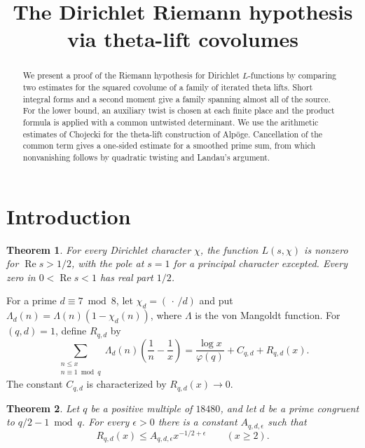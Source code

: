 \documentclass[11pt,reqno]{amsart}
\title[Dirichlet zeros and theta-lift volumes]{The Dirichlet Riemann hypothesis via theta-lift covolumes}
\newtheorem{theorem}{Theorem}[section]
\theoremstyle{definition}
\numberwithin{equation}{section}
\newcommand{\re}{\operatorname{Re}}
\begin{document}
\begin{abstract}
We present a proof of the Riemann hypothesis for Dirichlet
\(L\)-functions by comparing two estimates for the squared covolume
of a family of iterated theta lifts. Short integral forms and a
second moment give a family spanning almost all of the source.
For the lower bound, an auxiliary twist is chosen at each finite
place and the product formula is applied with a common untwisted
determinant. We use the arithmetic estimates of Chojecki for the
theta-lift construction of Alp\"oge. Cancellation of the common term
gives a one-sided estimate for a smoothed prime sum, from which
nonvanishing follows by quadratic twisting and Landau's argument.
\end{abstract}

\maketitle

\section{Introduction}

\begin{theorem}\label{thm:grh}
For every Dirichlet character \(\chi\), the function \(L(s,\chi)\)
is nonzero for \(\re s>1/2\), with the pole at \(s=1\) for a
principal character excepted. Every zero in \(0<\re s<1\)
has real part \(1/2\).
\end{theorem}

For a prime \(d\equiv7\bmod 8\), let \(\chi_d=(\,\cdot\,/d)\) and put
\(\Lambda_d(n)=\Lambda(n)(1-\chi_d(n))\), where \(\Lambda\) is the von
Mangoldt function. For \((q,d)=1\), define \(R_{q,d}\) by
\begin{equation}\label{eq:intro-remainder}
 \sum_{\substack{n\le x\\ n\equiv1\bmod q}}\Lambda_d(n)
       \left(\frac1n-\frac1x\right)
 = \frac{\log x}{\varphi(q)}+C_{q,d}+R_{q,d}(x).
\end{equation}
The constant \(C_{q,d}\) is characterized by \(R_{q,d}(x)\to0\).

\begin{theorem}\label{thm:prime}
Let \(q\) be a positive multiple of \(18480\), and let \(d\) be a
prime congruent to \(q/2-1\bmod q\). For every \(\epsilon>0\)
there is a constant \(A_{q,d,\epsilon}\) such that
\begin{equation}\label{eq:prime}
 R_{q,d}(x)\le A_{q,d,\epsilon} x^{-1/2+\epsilon}
 \qquad (x\ge2).
\end{equation}
\end{theorem}
\end{document}
